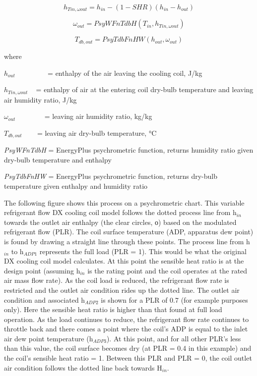 \begin{equation}
{h_{Tin,\omega out}} = {h_{in}} - \left( {1 - SHR} \right)\left( {{h_{in}} - {h_{out}}} \right)
\end{equation}

\begin{equation}
{\omega_{out}} = PsyWFnTdbH\left( {{T_{in}},{h_{Tin,\omega out}}} \right)
\end{equation}

\begin{equation}
{T_{db,out}} = PsyTdbFnHW\left( {{h_{out}},{\omega_{out}}} \right)
\end{equation}

where

\({{h_{out}}}\) ~~~~~~~~ = enthalpy of the air leaving the cooling coil, J/kg

\({{h_{Tin,\omega out}}}\) ~ = enthalpy of air at the entering coil dry-bulb temperature and leaving air humidity ratio, J/kg

\({{\omega_{out}}}\) ~~~~~~~ = leaving air humidity ratio, kg/kg

\({T_{db,out}}\) ~~~ = leaving air dry-bulb temperature, °C

\emph{PsyWFnTdbH} = EnergyPlus psychrometric function, returns humidity ratio given dry-bulb temperature and enthalpy

\emph{PsyTdbFnHW} = EnergyPlus psychrometric function, returns dry-bulb temperature given enthalpy and humidity ratio

The following figure shows this process on a psychrometric chart. This variable refrigerant flow DX cooling coil model follows the dotted process line from h\(_{in}\) towards the outlet air enthalpy (the clear circles, ο) based on the modulated refrigerant flow (PLR). The coil surface temperature (ADP, apparatus dew point) is found by drawing a straight line through these points. The process line from h\(_{in}\) to h\(_{ADP1}\) represents the full load (PLR = 1). This would be what the original DX cooling coil model calculates. At this point the sensible heat ratio is at the design point (assuming h\(_{in}\) is the rating point and the coil operates at the rated air mass flow rate). As the coil load is reduced, the refrigerant flow rate is restricted and the outlet air condition rides up the dotted line. The outlet air condition and associated h\(_{ADP2}\) is shown for a PLR of 0.7 (for example purposes only). Here the sensible heat ratio is higher than that found at full load operation. As the load continues to reduce, the refrigerant flow rate continues to throttle back and there comes a point where the coil's ADP is equal to the inlet air dew point temperature (h\(_{ADP3}\)). At this point, and for all other PLR's less than this value, the coil surface becomes dry (at PLR = 0.4 in this example) and the coil's sensible heat ratio = 1. Between this PLR and PLR = 0, the coil outlet air condition follows the dotted line back towards H\(_{in}\).

